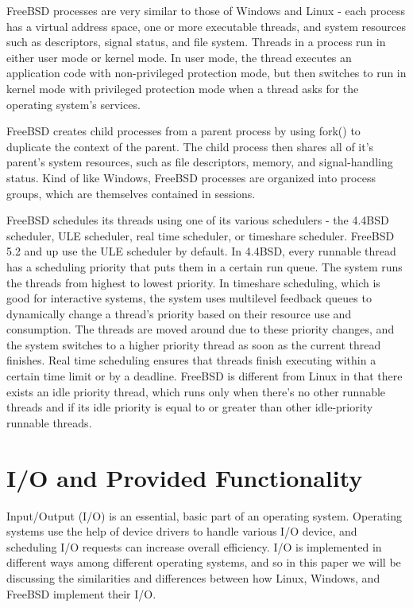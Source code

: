 \documentclass[10pt,draftclsnofoot,onecolumn,letterpaper]{IEEEtran}
\begin{document}
\vspace{5mm}

FreeBSD processes are very similar to those of Windows and Linux - each process has a virtual address space, one or more executable threads, and system resources such as descriptors, signal status, and file system. Threads in a process run in either user mode or kernel mode. In user mode, the thread executes an application code with non-privileged protection mode, but then switches to run in kernel mode with privileged protection mode when a thread asks for the operating system's services\cite{7}. \par
FreeBSD creates child processes from a parent process by using fork() to duplicate the context of the parent. The child process then shares all of it's parent's system resources, such as file descriptors, memory, and signal-handling status\cite{6}. Kind of like Windows, FreeBSD processes are organized into process groups, which are themselves contained in sessions. \par
FreeBSD schedules its threads using one of its various schedulers - the 4.4BSD scheduler, ULE scheduler, real time scheduler, or timeshare scheduler. FreeBSD 5.2 and up use the ULE scheduler by default. In 4.4BSD, every runnable thread has a scheduling priority that puts them in a certain run queue. The system runs the threads from highest to lowest priority\cite{5}. In timeshare scheduling, which is good for interactive systems, the system uses multilevel feedback queues to dynamically change a thread's priority based on their resource use and consumption. The threads are moved around due to these priority changes, and the system switches to a higher priority thread as soon as the current thread finishes\cite{7}. Real time scheduling ensures that threads finish executing within a certain time limit or by a deadline. FreeBSD is different from Linux in that there exists an idle priority thread, which runs only when there's no other runnable threads and if its idle priority is equal to or greater than other idle-priority runnable threads\cite{7}. \par


\section{I/O and Provided Functionality}

Input/Output (I/O) is an essential, basic part of an operating system. Operating systems use the help of device drivers to handle various I/O device, and scheduling I/O requests can increase overall efficiency. I/O is implemented in different ways among different operating systems, and so in this paper we will be discussing the similarities and differences between how Linux, Windows, and FreeBSD implement their I/O. \par
\end{document}
